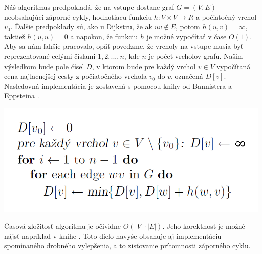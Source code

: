 Náš algoritmus predpokladá, že na vstupe dostane graf $G = (V, E)$ neobsahujúci záporné cykly, hodnotiacu funkciu $h: V \times V \rightarrow R$ a počiatočný vrchol $v_{0}$. Ďalšie predpoklady sú, ako u Dijkstru, že ak $uv \notin E$, potom $h(u,v) = \infty$, taktiež $h(u,u) = 0$ a napokon, že funkciu $h$ je možné vypočítať v čase $O(1)$. Aby sa nám ľahšie pracovalo, opäť povedzme, že vrcholy na vstupe musia byť reprezentované celými číslami $1, 2, ... , n$, kde $n$ je počet vrcholov grafu. Našim výsledkom bude pole čísel $D$, v ktorom bude pre každý vrchol $v \in V$ vypočítaná cena najlacnejšej cesty z počiatočného vrchola $v_{0}$ do $v$, označená $D [v]$. Nasledovná implementácia je zostavená s pomocou knihy od Bannistera a Eppsteina \cite{bannister2012randomized}.\newline

\begin{algorithm}[H]
  \includegraphics[width=\linewidth]{./images/Alg_Bellman-Ford.png}
  \caption{Bellman\textendash Fordov algoritmus}
  \label{Alg_Bellman-Ford}
  \centering
\end{algorithm}

Časová zložitosť algoritmu je očividne $O(|V|\cdot |E|)$. Jeho korektnosť je možné nájsť napríklad v knihe \cite[kapitola 3.3.4]{bang2008digraphs}. Toto dielo navyše obsahuje aj implementáciu spomínaného drobného vylepšenia, a to zisťovanie prítomnosti záporného cyklu.\newline

